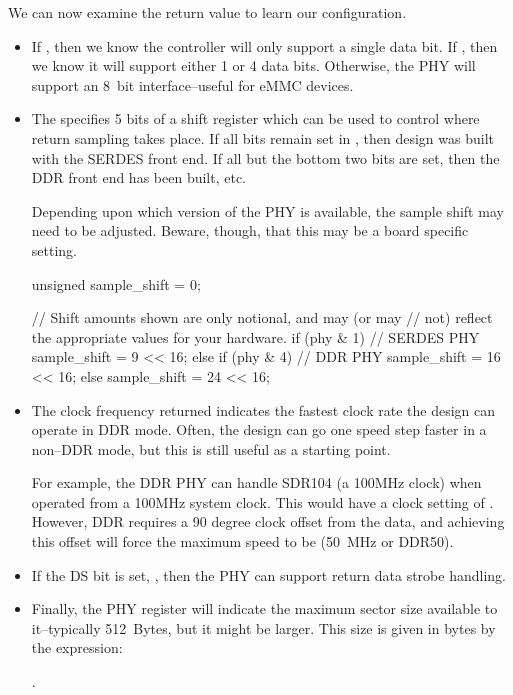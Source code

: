 \documentclass{gqtekspec}
\begin{document}
We can now examine the  return value to learn our configuration.
\begin{itemize}
\item If , then we know the controller will
	only support a single data bit.  If
	, then we know it will
	support either 1 or 4 data bits.  Otherwise, the PHY will support
	an 8~bit interface--useful for eMMC devices.

\item The  specifies 5 bits of a shift register
	which can be used to control where return sampling takes place.  If
	all bits remain set in , then design was built
	with the SERDES front end.  If all but the bottom two bits are
	set, then the DDR front end has been built, etc.

	Depending upon which version of the PHY is available, the sample
	shift may need to be adjusted.  Beware, though, that this may be
	a board specific setting.

\begin{zCpp}
	unsigned	sample_shift = 0;

	// Shift amounts shown are only notional, and may (or may
	// not) reflect the appropriate values for your hardware.
	if (phy & 1) {
		// SERDES PHY
		sample_shift = 9 << 16;
	} else if (phy & 4) {
		// DDR PHY
		sample_shift = 16 << 16;
	} else
		sample_shift = 24 << 16;
\end{zCpp}


\item The clock frequency returned indicates the fastest clock rate the design
	can operate in DDR mode.  Often, the design can go one speed step
	faster in a non--DDR mode, but this is still useful as a starting
	point.

	For example, the DDR PHY can handle SDR104 (a 100MHz clock) when
	operated from a 100MHz system clock.  This would have a clock setting
	of .  However, DDR requires a 90 degree
	clock offset from the data, and achieving this offset will force
	the maximum speed to be  (50~MHz or
	DDR50).

\item If the DS bit is set, , then the PHY can
	support return data strobe handling.

\item Finally, the PHY register will indicate the maximum sector size
	available to it--typically 512~Bytes, but it might be larger.
	This size is given in bytes by the expression:

	.
\end{itemize}
\end{document}
